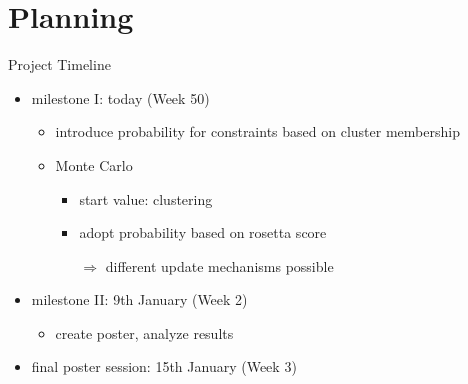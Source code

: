 \documentclass{beamer}
\begin{document}
\section{Planning}
\frame{\tableofcontents[currentsection]}
\begin{frame}{Project Timeline}
\begin{itemize}
\item milestone I: today (Week 50)
    \begin{itemize}
    \item introduce probability for constraints based on cluster membership
    \item Monte Carlo
        \begin{itemize}
        \item start value: clustering
        \item adopt probability based on rosetta score
        \item[$\Rightarrow$] different update mechanisms possible
        \end{itemize}
    \end{itemize}
\item milestone II: 9th January (Week 2)
    \begin{itemize}
    \item create poster, analyze results
    \end{itemize}
\item final poster session: 15th January (Week 3)
\end{itemize}
\end{frame}



\end{document}
